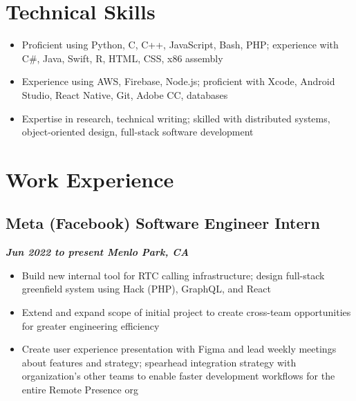 \documentclass[10pt]{article}
\begin{document}
\begin{raggedright}
    \section*{Technical Skills}

        \begin{itemize}
            \item Proficient using Python, C, C++, JavaScript, Bash, PHP; experience with C\#, Java, Swift, R, HTML, CSS, x86 assembly
            \item Experience using AWS, Firebase, Node.js; proficient with Xcode, Android Studio, React Native, Git, Adobe CC, databases
            \item Expertise in research, technical writing; skilled with distributed systems, object-oriented design, full-stack software development
        \end{itemize}

    \section*{Work Experience}

	    \subsection*{\textbf{\large{Meta (Facebook) \textendash{} Software Engineer Intern}}} \hfill \textbf{\textit{Jun 2022 to present \textendash{} Menlo Park, CA}}
        \begin{itemize}
            \item Build new internal tool for RTC calling infrastructure; design full-stack greenfield system using Hack (PHP), GraphQL, and React
            \item Extend and expand scope of initial project to create cross-team opportunities for greater engineering efficiency
            \item Create user experience presentation with Figma and lead weekly meetings about features and strategy; spearhead integration strategy with organization's other teams to enable faster development workflows for the entire Remote Presence org
        \end{itemize}


\end{raggedright}
\end{document}

